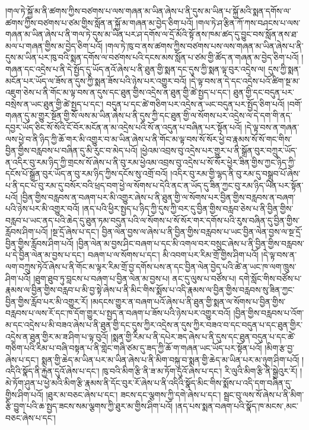 །གལ་ཏེ་སྐྱོ་མ་ནི་ཚགས་ཀྱིས་བཙགས་པ་ལས་གཞན་མ་ཡིན་ཞེས་པ་ནི་དུས་མ་ཡིན་པ་སྐྱོ་མའི་སྨན་དགོས་ལ་ཚགས་ཀྱིས་བཙགས་པ་ཙམ་གྱིས་སློན་ན་སྐྱོ་མ་གཞན་མ་བྱེད་ཅིག་པའོ། །གལ་ཏེ་ཤ་རྩིན་ཀོ་ཀས་བཤངས་པ་ལས་གཞན་མ་ཡིན་ཞེས་པ་ནི་གལ་ཏེ་དུས་མ་ཡིན་པར་ཤ་དགོས་ལ་དྲོ་མོའི་སྟོ་ནས་ཁམ་ཚད་དུ་བྱུང་བས་སློན་ནས་ཐ་མལ་པ་གཞན་གྱིས་མ་བྱེད་ཅིག་པའོ། །གལ་ཏེ་ཁུ་བ་ནས་ཚགས་ཀྱིས་བཙགས་པས་ལས་གཞན་མ་ཡིན་ཞེས་པ་ནི་དུས་མ་ཡིན་པར་ཁུ་བའི་སྨན་དགོས་ལ་བཙགས་པའི་དངས་མས་སློན་པ་ཙམ་གྱི་ཚོད་ན་གཞན་མ་བྱེད་ཅིག་པའོ། །གཞན་དང་འདྲེས་པ་ནི་དེ་སྤྱོད་དུ་ཡོད་ནའོ་ཞེས་པ་ནི་ཐུན་གྱི་སྨན་དང་དུས་ཀྱི་སྨན་ལྟ་བུར་འདྲེས་ལ། དུས་ཀྱི་སྨན་མངོན་པར་ཡོད་ལ་ཟོས་ན་དུས་ཀྱི་སྨན་ཟོས་པའི་ཉེས་པར་འགྱུར་བའོ། །དེ་ལྟ་བས་ན་དེ་དང་འདྲེས་པའོ་ཚིག་སྔ་མ་འཇུག་ཅེས་པ་ནི་གོང་མ་ལྟ་བས་ན་དུས་དང་ཐུན་གྱིས་འདྲེས་ན་ཐུན་གྱི་ཚེ་སྤྱད་པ་དང་། ཐུན་གྱི་དང་བདུན་པར་བསྲེས་ན་ཡང་ཐུན་གྱི་ཚེ་སྤྱད་པ་དང་། བདུན་པ་དང་ཚེ་གཅིག་པར་འདྲེས་ན་ཡང་བདུན་པར་སྤྱོད་ཅིག་པའོ། །བགོ་གཞན་དུ་མ་གྱུར་སྔོན་གྱི་སོ་ལས་མ་ཡིན་ཞེས་པ་ནི་དུས་ཀྱི་དང་ཐུན་གྱི་ལ་སོགས་པར་འདྲེས་ལ་དེ་དག་གི་ནད་དབྱར་ཡོད་ཅིང་སོ་སོའི་ངོ་བོར་མངོན་ན་མ་འདྲེས་པའི་སོ་ན་འདུན་པ་བཞིན་པར་སྟོན་པའོ། །དེ་ལྟ་བས་ན་གཞན་ལས་ཕྱེ་བ་ནི་ཉིད་ཀྱི་ཆོ་གར་མི་འགྱུར་བ་མ་ཡིན་ཞེས་པ་ནི་གོང་མ་ལྟ་བས་སོ་སོར་ཕྱེ་བ་རྣམས་སོ་སོ་གང་གིས་བྱིན་གྱིས་བརླབས་པ་བཞིན་དུ་མི་རུང་བ་མེད་པའོ། །ཕྱེའམ་འབྲས་བུ་འདྲེས་པར་གྱུར་པ་ནི་སྒྲོན་བུར་བཀྲུར་ཡོད་ན་འདིར་བུ་རམ་ཉིད་ཀྱི་གྲངས་སོ་ཞེས་པ་ནི་བུ་རམ་ཕྱེའམ་འབྲས་བུ་འདྲེས་པ་སོ་སོར་ཕྱེར་ཟིན་གྱིས་ཀྱང་ཉིད་ཀྱི་དངོས་པོ་སྒྲོན་བུར་ཡོད་ན་བུ་རམ་ཉིད་ཀྱིས་དངོས་སུ་འགྲོ་བའོ། །འདིར་བུ་རམ་གྱི་ལྷད་ནི་བུ་རམ་དུ་བསྒྲུབ་པོ་ཞེས་པ་ནི་དང་པོ་བུ་རམ་དུ་བསོར་བའི་ཕྲད་བག་ཕྱེ་ལ་སོགས་པ་དེའི་ནང་ན་ཡོད་དུ་ཟིན་ཀྱང་བུ་རམ་ཉིད་ཡིན་པར་སྟོན་པའོ། །བྱིན་གྱིས་བརླབས་ན་བཞག་པར་མི་འགྱུར་ཞེས་པ་ནི་ཐུན་གྱི་ལ་སོགས་པར་བྱིན་གྱིས་བརླབས་ན་བཞག་པའི་ཉེས་པར་མི་འགྱུར་བའོ། །ནད་པའི་ཕྱིར་སྤྱད་པ་ཉིད་ཀྱི་དུས་ཀྱི་བར་དུ་བྱིན་གྱིས་བརླབ་ཅེས་པ་ནི་བྱིན་གྱིས་བརླབ་པ་ཡང་ནད་པའི་ཆེད་དུ་ཐུན་ཏམ་བདུན་པའི་ལ་སོགས་པ་སོ་སོར་གར་དགོས་པའི་རུས་བཞིན་དུ་བྱིན་གྱིས་རློབས་ཤིག་པའོ། །སྔ་དྲོ་ཞེས་པ་དང་། བྱིན་ལེན་བྱས་ལ་ཞེས་པ་ནི་བྱིན་གྱིས་བརླབས་པ་ཡང་བྱིན་ལེན་བྱས་ལ་སྔ་དྲོ་བྱིན་གྱིས་རློབས་ཤིག་པའོ། །བྱིན་ལེན་མ་བྱས་ཤིང་བཞག་པ་དང་མི་འགལ་བར་བསྲུང་ཞེས་པ་ནི་བྱིན་གྱིས་བརླབས་པ་དེ་བྱིན་ལེན་མ་བྱས་པ་དང་། བཞག་པ་ལ་སོགས་པ་དང་། མི་འབག་པར་རིམ་གྲོ་གྱིས་ཤིག་པའོ། །དེ་ལྟ་བས་ན་ལག་བཀྲུས་ཏེའོ་ཞེས་པ་ནི་གོང་མ་ལྟར་རིམ་གྲོ་བྱ་དགོས་པས་ན་དང་བྱིན་ལེན་བྱེད་པའི་ཚེ་ན་ཡང་ཁ་ལག་ཁྲུས་ཤིག་པའོ། །ཐུག་ཐུབ་ཏུ་བླངས་པ་བཞག་པ་བྱིན་ལེན་མ་བྱས་པ། ནང་དུ་ལུས་པ་བཙོས་པ། དགེ་སློང་གིས་བཙོས་པ་རྣམས་ལ་བྱིན་གྱིས་བརླབ་པ་མི་བྱ་སྟེ་ཞེས་པ་ནི་མིང་གིས་སྨོས་པ་འདི་རྣམས་ལ་བྱིན་གྱིས་བརླབས་སུ་ཟིན་ཀྱང་བྱིན་གྱིས་རློབ་པར་མི་འགྱུར་རོ། །མདངས་གྱུར་ན་བཞག་པའོ་ཞེས་པ་ནི་ཐུན་གྱི་སྨན་ལ་སོགས་པ་བྱིན་གྱིས་བརླབས་པ་ལས་རོ་དང་ཁ་དོག་གྱུར་པ་སྤྱད་ན་བཞག་པ་ཟོས་པའི་ཉེས་པར་འགྱུར་བའོ། །བྱིན་གྱིས་བརླབས་པ་འོག་མ་དང་འདྲེས་པ་མི་བཟའ་ཞེས་པ་ནི་ཐུན་གྱི་དང་དུས་ཀྱིར་འདྲེས་ན་དུས་ཀྱིར་བཟའ་བ་དང་བདུན་པ་དང་ཐུན་གྱིར་འདྲེས་ན་ཐུན་གྱིར་མ་ཟ་ཤིག་པ་ལྟ་བུའོ། །སྨན་གྱི་རིམ་པ་ནི་དཔེར་ཟད་ཞེས་པ་ནི་དུས་དང་ཐུན་བདུན་པ་དང་ཚེ་གཅིག་པའི་རིམ་པ་བཞི་བསྟན་པ་ནི་གླེང་གཞི་ཙམ་དུ་ཟད་ཀྱི་ཆོ་ག་གཞན་ཡང་ཡོད་པར་སྟོན་པའོ། །མིག་རྩ་བྱ་ཞེས་པ་དང་། སྨན་གྱི་ཆེད་མ་ཡིན་པར་མ་ཡིན་ཞེས་པ་ནི་མིག་བསྐུ་བ་སྨན་གྱི་ཆེད་མ་ཡིན་པར་མ་ཉུག་ཤིག་པའོ། །འདིའི་སྣོད་ནི་རྐྱེན་དུའོ་ཞེས་པ་དང་། ཁུ་བའི་མིག་རྩི་ནི་ཟ་མ་ཏོག་དུའོ་ཞེས་པ་དང་། རི་ལུའི་མིག་རྩི་ནི་སྒྱེའུར་རོ། །མེ་ཏོག་ཤུན་པ་ཕྱེ་མའི་མིག་རྩི་རྣམས་ནི་དོང་བུར་རོ་ཞེས་པ་ནི་འདིའི་སྣོད་མིང་གིས་སྨོས་པ་འདི་དག་བཞིན་དུ་གྱིས་ཤིག་པའོ། །ཐུར་མ་བཅང་ཞེས་པ་དང་། ཟངས་དང་ལྕགས་ཀྱི་དགེ་ཞེས་པ་དང་། སྦྲང་བུ་ལས་སོ་ཞེས་པ་ནི་མིག་རྩི་བྱུག་པའི་ཆ་སྤྱད་ཟངས་སམ་ལྕགས་ཀྱི་ཐུར་མ་གྱིས་ཤིག་པའོ། །ནད་པས་སྨན་བཞག་པའི་སྣོད་ཁ་{མངས་,མང་}བཅང་ཞེས་པ་དང་། 